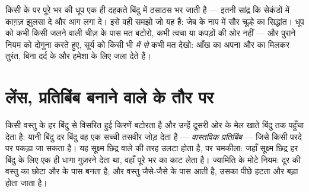 \begin{remark}[जलाने वाला काँच]\label{rem:g8:lenses-images:burning}
किसी  के  पर पूरे  भर की धूप एक ही दहकते
बिंदु में ठसाठस भर जाती है --- इतनी सांद्र कि सेकंडों में काग़ज़ झुलसा
दे और आग लगा दे। इसे वही समझो जो यह है: जेब के नाप में सौर चूल्हे का
सिद्धांत। धूप को कभी किसी जलने वाली चीज़ के पास मत बटोरो, कभी त्वचा या
कपड़ों की ओर नहीं --- और पुराने नियम को दोगुना करते हुए, सूर्य को किसी
भी  \emph{में से} कभी मत देखो: आँख का अपना  और  का 
मिलकर तुरंत, बिना दर्द के और हमेशा के लिए जला देते हैं।
\end{remark}

\section{लेंस, प्रतिबिंब बनाने वाले के तौर पर}

\begin{proposition}[वास्तविक प्रतिबिंब]\label{prop:g8:lenses-images:realimage}
 किसी वस्तु के हर बिंदु से विसरित हुई किरणें बटोरता है और
उन्हें दूसरी ओर के मेल खाते बिंदु तक पहुँचा देता है: यानी बिंदु दर
बिंदु वह एक सच्ची तसवीर जोड़ देता है --- \emph{वास्तविक
प्रतिबिंब} --- जिसे किसी परदे पर पकड़ा जा
सकता है। यह  सूक्ष्म छिद्र वाले की तरह उलटा होता है, पर
चमकीला: जहाँ सूक्ष्म छिद्र हर बिंदु के लिए एक ही धागा गुज़रने देता था,
वहाँ  पूरे  भर का  काट लेता है। ज्यामिति के मोटे नियम:
दूर की वस्तु का  छोटा और  के पास बनता है; और वस्तु
जैसे-जैसे  के पास आती है, उसका  पीछे हटता और बड़ा होता
जाता है।
\end{proposition}

